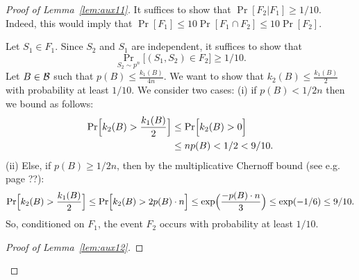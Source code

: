 \documentclass{article}
\newcommand{\B}{{\cal B}}
\begin{document}
\begin{proof}[Proof of Lemma~\ref{lem:aux11}]
It suffices to show that $\Pr[F_2 \vert F_1]\geq 1/10$.
Indeed, this would imply that 
$\Pr[F_1] \leq 10\Pr[F_1 \cap F_2]\leq 10\Pr[F_2]$.

Let $S_1\in F_1$. Since $S_2$ and $S_1$ are independent,
it suffices to show that 
\[\Pr_{S_2\sim p^n}\bigl[(S_1,S_2)\in F_2\bigr] \geq 1/10.\]
Let $B\in\B$ such that $p(B)\leq \frac{k_{1}(B)}{4n}$.
We want to show that $k_{2}(B)\leq \frac{k_{1}(B)}{2}$ with probability at least $1/10$.
We consider two cases:
(i) if $p(B) < 1/2n$
then we bound as follows:
\begin{align*}
\Pr\Bigl[ k_{2}(B) > \frac{k_{1}(B)}{2}\Bigr]
&\leq
\Pr\Bigl[ k_{2}(B) > 0 \Bigr]\\
&\leq np(B) < 1/2 < 9/10.
\end{align*}
(ii) Else, if $p(B) \geq 1/2n$, then by the multiplicative Chernoff bound (see e.g.\cite{} page ??):
\[
\Pr\Bigl[ k_{2}(B) > \frac{k_{1}(B)}{2}\Bigr]
\leq
\Pr\Bigl[ k_{2}(B) > 2p(B)\cdot n\Bigr]
\leq
\exp\Bigl( \frac{-p(B)\cdot n}{3}\Bigr)\leq \exp(-1/6)\leq 9/10.
\]
So, conditioned on $F_1$, 
the event $F_2$ occurs with probability at least $1/10$.

\begin{proof}[Proof of Lemma~\ref{lem:aux12}]


\end{proof}
\end{proof}
\end{document}
